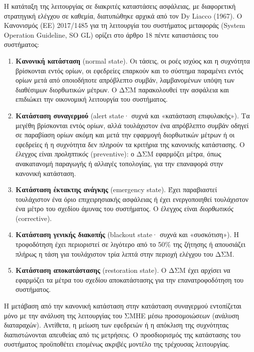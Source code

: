Η κατάταξη της λειτουργίας σε διακριτές καταστάσεις ασφάλειας, με διαφορετική στρατηγική
ελέγχου σε καθεμία, διατυπώθηκε αρχικά από τον Dy Liacco (1967). Ο
Κανονισμός (ΕΕ) 2017/1485 για τη λειτουργία του συστήματος μεταφοράς (System Operation
Guideline, SO GL) ορίζει στο άρθρο 18 πέντε καταστάσεις του συστήματος:

\begin{enumerate}
\item \textbf{Κανονική κατάσταση} (normal state). Οι τάσεις, οι ροές ισχύος και η συχνότητα
      βρίσκονται εντός ορίων, οι εφεδρείες επαρκούν και το σύστημα παραμένει εντός ορίων μετά
      από οποιοδήποτε απρόβλεπτο συμβάν, λαμβανομένων υπόψη
      των διαθέσιμων διορθωτικών μέτρων. Ο ΔΣΜ παρακολουθεί την ασφάλεια και επιδιώκει την
      οικονομική λειτουργία του συστήματος.
\item \textbf{Κατάσταση συναγερμού} (alert state· συχνά και «κατάσταση επιφυλακής»). Τα
      μεγέθη βρίσκονται εντός ορίων, αλλά τουλάχιστον ένα απρόβλεπτο συμβάν
      οδηγεί σε παραβίαση ορίων ακόμη και μετά την εφαρμογή διορθωτικών μέτρων ή οι εφεδρείες
      ή η συχνότητα δεν πληρούν τα κριτήρια της κανονικής κατάστασης. Ο έλεγχος είναι
      \emph{προληπτικός} (preventive): ο ΔΣΜ εφαρμόζει μέτρα, όπως ανακατανομή παραγωγής ή
      αλλαγές τοπολογίας, για την επαναφορά στην κανονική κατάσταση.
\item \textbf{Κατάσταση έκτακτης ανάγκης} (emergency state). Έχει παραβιαστεί τουλάχιστον
      ένα όριο επιχειρησιακής ασφάλειας ή έχει ενεργοποιηθεί τουλάχιστον ένα μέτρο του
      σχεδίου άμυνας του συστήματος. Ο έλεγχος είναι \emph{διορθωτικός} (corrective).
\item \textbf{Κατάσταση γενικής διακοπής} (blackout state· συχνά και «συσκότιση»). Η τροφοδότηση έχει περιοριστεί σε λιγότερο από το 50\% της ζήτησης ή απουσιάζει πλήρως η τάση για
      τουλάχιστον τρία λεπτά στην περιοχή ελέγχου του ΔΣΜ.
\item \textbf{Κατάσταση αποκατάστασης} (restoration state). Ο ΔΣΜ έχει αρχίσει να
      εφαρμόζει τα μέτρα του σχεδίου αποκατάστασης για την επανατροφοδότηση του
      συστήματος.
\end{enumerate}

Η μετάβαση από την κανονική κατάσταση στην κατάσταση συναγερμού εντοπίζεται μόνο με την
ανάλυση της λειτουργίας του ΣΜΗΕ μέσω προσομοιώσεων (ανάλυση διαταραχών). Αντίθετα, η μείωση των εφεδρειών ή η απόκλιση της
συχνότητας διαπιστώνονται απευθείας από τις μετρήσεις. Ο προσδιορισμός της κατάστασης του συστήματος προϋποθέτει
επομένως ακριβές μοντέλο της τρέχουσας λειτουργίας.

